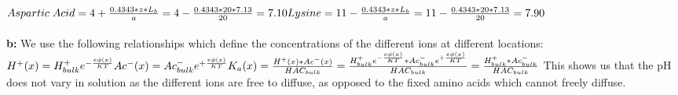 \documentclass[12pt]{article}
\begin{document}
$
\noindent Aspartic \; Acid = 4 + \frac{0.4343*z*L_b}{a} = 4 - \frac{0.4343*20*7.13}{20} = 7.10\\
Lysine = 11 - \frac{0.4343*z*L_b}{a} = 11 - \frac{0.4343*20*7.13}{20} = 7.90\\
$
\\\\
\textbf{b: }
We use the following relationships which define the concentrations of the different ions at different locations:\\
$
H^+(x) = H^+_{bulk} e^{-\frac{e\phi(x)}{KT}}\\
Ac^-(x) = Ac^-_{bulk} e^{+\frac{e\phi(x)}{KT}}\\
K_a(x) = \frac{H^+(x) * Ac^-(x)}{HAC_{bulk}} = \frac{ H^+_{bulk} e^{-\frac{e\phi(x)}{KT}} * Ac^-_{bulk} e^{+\frac{e\phi(x)}{KT}}}{HAC_{bulk}} =\frac{H^+_{bulk} * Ac^-_{bulk}}{HAC_{bulk}} \\
$
This shows us that the pH does not vary in solution as the different ions are free to diffuse, as opposed to the fixed amino acids which cannot freely diffuse. 
\end{document}
